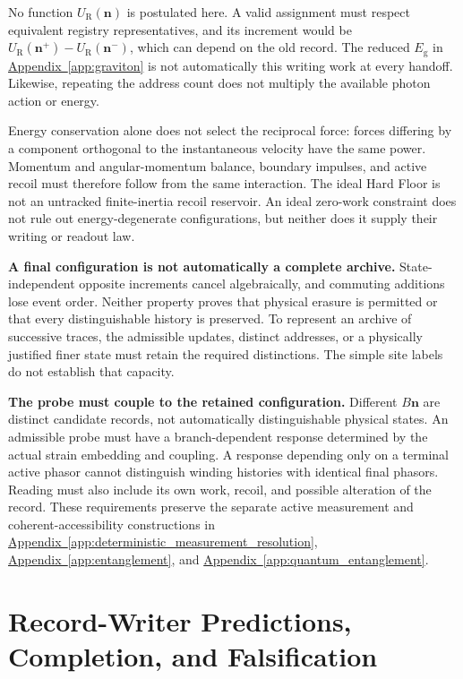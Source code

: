 No function $U_{\mathrm R}(\mathbf n)$ is postulated here. A valid assignment must respect equivalent registry representatives, and its increment would be $U_{\mathrm R}(\mathbf n^{+})-U_{\mathrm R}(\mathbf n^{-})$, which can depend on the old record. The reduced $E_{\mathrm g}$ in \hyperref[app:graviton]{Appendix~\ref*{app:graviton}} is not automatically this writing work at every handoff. Likewise, repeating the address count does not multiply the available photon action or energy.

Energy conservation alone does not select the reciprocal force: forces differing by a component orthogonal to the instantaneous velocity have the same power. Momentum and angular-momentum balance, boundary impulses, and active recoil must therefore follow from the same interaction. The ideal Hard Floor is not an untracked finite-inertia recoil reservoir. An ideal zero-work constraint does not rule out energy-degenerate configurations, but neither does it supply their writing or readout law.

\medskip
\noindent\textbf{A final configuration is not automatically a complete archive.}
State-independent opposite increments cancel algebraically, and commuting additions lose event order. Neither property proves that physical erasure is permitted or that every distinguishable history is preserved. To represent an archive of successive traces, the admissible updates, distinct addresses, or a physically justified finer state must retain the required distinctions. The simple site labels do not establish that capacity.

\medskip
\noindent\textbf{The probe must couple to the retained configuration.}
Different $B\mathbf n$ are distinct candidate records, not automatically distinguishable physical states. An admissible probe must have a branch-dependent response determined by the actual strain embedding and coupling. A response depending only on a terminal active phasor cannot distinguish winding histories with identical final phasors. Reading must also include its own work, recoil, and possible alteration of the record. These requirements preserve the separate active measurement and coherent-accessibility constructions in \hyperref[app:deterministic_measurement_resolution]{Appendix~\ref*{app:deterministic_measurement_resolution}}, \hyperref[app:entanglement]{Appendix~\ref*{app:entanglement}}, and \hyperref[app:quantum_entanglement]{Appendix~\ref*{app:quantum_entanglement}}.

\section{Record-Writer Predictions, Completion, and Falsification}
\label{sec:AW_completion}

